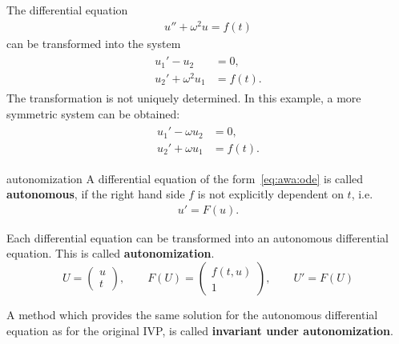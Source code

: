 \begin{example}
  \label{ex:awa:sine-1}
  The differential equation
  \begin{gather}
    \label{eq:awa:17}
    u'' + \omega^2 u = f(t)
  \end{gather}
  can be transformed into the system
  \begin{gather}
    \label{eq:awa:18}
    \begin{split}
      u_1' - u_2 &= 0, \\
      u_2' + \omega^2 u_1 &= f(t).
    \end{split}
  \end{gather}
  The transformation is not uniquely determined. In this example, a
  more symmetric system can be obtained:
  \begin{gather}
    \label{eq:awa:18a}
    \begin{split}
      u_1' - \omega u_2 &= 0, \\
      u_2' + \omega u_1 &= f(t).
    \end{split}
  \end{gather}
\end{example}

\begin{Definition}{autonomization}
  A differential equation of the form~\eqref{eq:awa:ode} is called
  \textbf{autonomous},  if
  the right hand side $f$ is not explicitly dependent on $t$, i.e.
  \begin{gather}
    u'=F(u).
  \end{gather}

  Each differential equation can be transformed into an autonomous
  differential equation.  This is called
  \textbf{autonomization}. 
  \begin{equation*}
    U = \begin{pmatrix} u \\ t \end{pmatrix},
    \qquad
    F(U) = \begin{pmatrix} f(t,u) \\ 1 \end{pmatrix},
    \qquad
    U' = F(U)
  \end{equation*}

  A method which provides the same solution for the autonomous
  differential equation as for the original IVP, is called
  \textbf{invariant under autonomization}.
\end{Definition}


